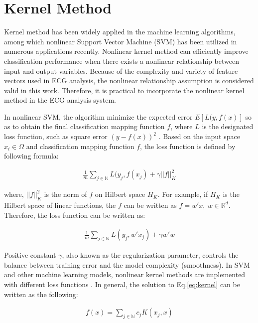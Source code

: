 \section{Kernel Method}

Kernel method has been widely applied in the machine learning algorithms, among which nonlinear Support Vector Machine (SVM) has been utilized in numerous applications recently\cite{shawe2004kernel}. Nonlinear kernel method can efficiently improve classification performance when there exists a nonlinear relationship between input and output variables. Because of the complexity and variety of feature vectors used in ECG analysis, the nonlinear relationship assumption is considered valid in this work. Therefore, it is practical to incorporate the nonlinear kernel method in the ECG analysis system.


In nonlinear SVM, the algorithm  minimize the expected error $E[L(y,f(x)]$ so as to obtain the final classification mapping function $f$, where $L$ is the designated loss function, such as square error $(y-f(x))^2$ \cite{scholkopf1999advances}. Based on the input space $x_i\in \Omega$ and classification mapping function $f$, the loss function is defined by following formula:

\begin{align}
    \frac{1}{m}\sum_{j\in \mathbb{N}}L(y_j,f(x_j) + \gamma||f||_K^2
\end{align}

where, $||f||_K^2$ is the norm of $f$ on Hilbert space $H_K$. For example, if $H_K$ is the Hilbert space of linear functions, the $f$ can be written as $f=w' x,~w\in\mathbb{R}^d$. Therefore, the loss function can be written as:

\begin{align}
    \frac{1}{m}\sum_{j\in \mathbb{N}}L(y_j,w'x_j) + \gamma w'w
    \label{eq:kernel}
\end{align}

Positive constant $\gamma$, also known as the regularization parameter, controls the balance between training error and the model complexity (smoothness). In SVM and other machine learning models, nonlinear kernel methods are implemented with different loss functions \cite{evgeniou2000regularization}. In general, the solution to Eq.\ref{eq:kernel} can be written as the following: 

\begin{align}
    f(x)=\sum_{j\in \mathbb{N}}c_j K(x_j,x)
    \label{eq:kernel2}
\end{align}

